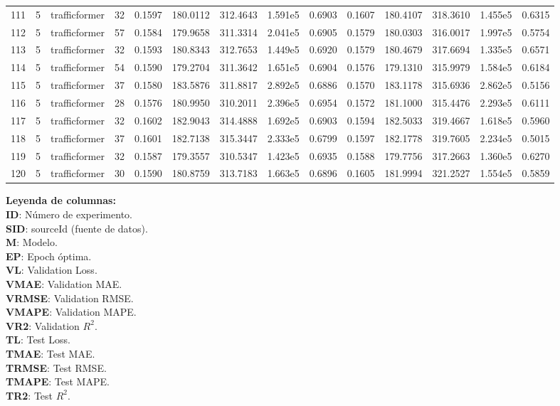 \begin{landscape}
\begin{longtable}{c | c | c | c | c | c | c | c | c | c | c | c | c | c}
	111 & 5 & trafficformer & 32 & 0.1597 & 180.0112 & 312.4643 & 1.591e5 & 0.6903 & 0.1607 & 180.4107 & 318.3610 & 1.455e5 & 0.6315 \\
	112 & 5 & trafficformer & 57 & 0.1584 & 179.9658 & 311.3314 & 2.041e5 & 0.6905 & 0.1579 & 180.0303 & 316.0017 & 1.997e5 & 0.5754 \\
	113 & 5 & trafficformer & 32 & 0.1593 & 180.8343 & 312.7653 & 1.449e5 & 0.6920 & 0.1579 & 180.4679 & 317.6694 & 1.335e5 & 0.6571 \\
	114 & 5 & trafficformer & 54 & 0.1590 & 179.2704 & 311.3642 & 1.651e5 & 0.6904 & 0.1576 & 179.1310 & 315.9979 & 1.584e5 & 0.6184 \\
	115 & 5 & trafficformer & 37 & 0.1580 & 183.5876 & 311.8817 & 2.892e5 & 0.6886 & 0.1570 & 183.1178 & 315.6936 & 2.862e5 & 0.5156 \\
	116 & 5 & trafficformer & 28 & 0.1576 & 180.9950 & 310.2011 & 2.396e5 & 0.6954 & 0.1572 & 181.1000 & 315.4476 & 2.293e5 & 0.6111 \\
	117 & 5 & trafficformer & 32 & 0.1602 & 182.9043 & 314.4888 & 1.692e5 & 0.6903 & 0.1594 & 182.5033 & 319.4667 & 1.618e5 & 0.5960 \\
	118 & 5 & trafficformer & 37 & 0.1601 & 182.7138 & 315.3447 & 2.333e5 & 0.6799 & 0.1597 & 182.1778 & 319.7605 & 2.234e5 & 0.5015 \\
	119 & 5 & trafficformer & 32 & 0.1587 & 179.3557 & 310.5347 & 1.423e5 & 0.6935 & 0.1588 & 179.7756 & 317.2663 & 1.360e5 & 0.6270 \\
	120 & 5 & trafficformer & 30 & 0.1590 & 180.8759 & 313.7183 & 1.663e5 & 0.6896 & 0.1605 & 181.9994 & 321.2527 & 1.554e5 & 0.5859 \\
\end{longtable}

\vspace{0.5em}
\begin{minipage}{0.99\textwidth}
\footnotesize
\textbf{Leyenda de columnas:} \\
\textbf{ID}: Número de experimento. \\
\textbf{SID}: sourceId (fuente de datos). \\
\textbf{M}: Modelo. \\
\textbf{EP}: Epoch óptima. \\
\textbf{VL}: Validation Loss. \\
\textbf{VMAE}: Validation MAE. \\
\textbf{VRMSE}: Validation RMSE. \\
\textbf{VMAPE}: Validation MAPE. \\
\textbf{VR2}: Validation $R^2$. \\
\textbf{TL}: Test Loss. \\
\textbf{TMAE}: Test MAE. \\
\textbf{TRMSE}: Test RMSE. \\
\textbf{TMAPE}: Test MAPE. \\
\textbf{TR2}: Test $R^2$.\\
\end{minipage}
\end{landscape}

